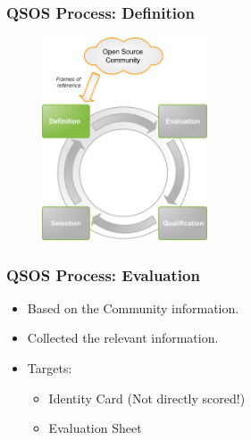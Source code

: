 \documentclass{beamer}
\begin{document}

\begin{frame}
\frametitle{QSOS Process: Definition}
\begin{center}
\begin{figure}
 \includegraphics[height=6cm]{figs/QSOS_Process_Definition.png}
\end{figure}
\end{center}
\end{frame}


\begin{frame}
 \frametitle{QSOS Process: Evaluation}
 \begin{itemize}
 \item Based on the Community information.
 \item Collected the relevant information.
 \item Targets:
    \begin{itemize}
     \item Identity Card (Not directly scored!)
     \item Evaluation Sheet
    \end{itemize}
 \end{itemize}
\end{frame}

\end{document}
